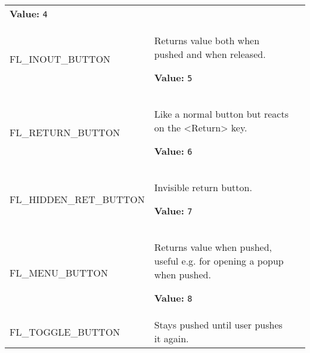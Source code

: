 \begin{longtable}{|p{\varnamewidth}|p{\vardescrwidth}|l}
\textbf{Value:} 
{\tt 4}&\\
\cline{1-2}
\raggedright F\-L\-\_\-I\-N\-O\-U\-T\-\_\-B\-U\-T\-T\-O\-N\- & \raggedright Returns value both when pushed and when released.

\textbf{Value:} 
{\tt 5}&\\
\cline{1-2}
\raggedright F\-L\-\_\-R\-E\-T\-U\-R\-N\-\_\-B\-U\-T\-T\-O\-N\- & \raggedright Like a normal button but reacts on the 
          {\textless}Return{\textgreater} key.

\textbf{Value:} 
{\tt 6}&\\
\cline{1-2}
\raggedright F\-L\-\_\-H\-I\-D\-D\-E\-N\-\_\-R\-E\-T\-\_\-B\-U\-T\-T\-O\-N\- & \raggedright Invisible return button.

\textbf{Value:} 
{\tt 7}&\\
\cline{1-2}
\raggedright F\-L\-\_\-M\-E\-N\-U\-\_\-B\-U\-T\-T\-O\-N\- & \raggedright Returns value when pushed, useful e.g. for opening a popup when 
          pushed.

\textbf{Value:} 
{\tt 8}&\\
\cline{1-2}
\raggedright F\-L\-\_\-T\-O\-G\-G\-L\-E\-\_\-B\-U\-T\-T\-O\-N\- & \raggedright Stays pushed until user pushes it again.


\end{longtable}

